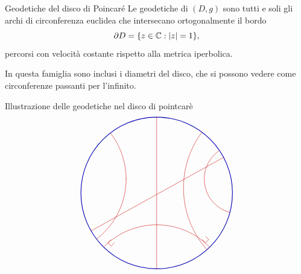 \documentclass[a4paper]{article}
\begin{document}
\begin{snippettheorem}{Geodetiche del disco di Poincaré}
Le geodetiche di \((D,g)\) sono tutti e soli gli archi di circonferenza euclidea che intersecano ortogonalmente il bordo
\[
    \partial D=\{z\in\mathbb{C}:|z|=1\},
\]
percorsi con velocità costante rispetto alla metrica iperbolica.

In questa famiglia sono inclusi i diametri del disco, che si possono vedere come circonferenze passanti per l'infinito.
\end{snippettheorem}

Illustrazione delle geodetiche nel disco di pointcarè
\[
\begin{tikzpicture}[scale=1.05, line cap=round, line join=round]
    \def\R{3}

    \colorlet{bordodisco}{blue!70!black}
    \colorlet{geod}{red!80!black}

    \pgfmathsetmacro{\rLeft}{sqrt((-4.20)^2 + (0.55)^2 - \R^2)}
    \pgfmathsetmacro{\rRightBig}{sqrt((4.75)^2 + (0.20)^2 - \R^2)}
    \pgfmathsetmacro{\rBottom}{sqrt((4.20)^2 - \R^2)}
    \pgfmathsetmacro{\rRightSmall}{sqrt((3.25)^2 + (0.55)^2 - \R^2)}

    \draw[bordodisco, thick] (0,0) circle[radius=\R];

    \draw[geod] (0,-\R) -- (0,\R);
    \draw[geod] ({\R*cos(210)},{\R*sin(210)}) -- ({\R*cos(28)},{\R*sin(28)});

    \begin{scope}
        \clip (0,0) circle[radius=\R];

        \draw[geod] (-4.20,0.55) circle[radius=\rLeft];

        \draw[geod] (4.75,0.20) circle[radius=\rRightBig];

        \draw[geod] (0,-4.20) circle[radius=\rBottom];

        \draw[geod] (3.25,0.55) circle[radius=\rRightSmall];
    \end{scope}

    \begin{scope}[shift={({0.86*\R*cos(-134.4)},{0.86*\R*sin(-134.4)})}, rotate=-134.4]
        \draw[geod] (0,0) -- (0.18,0) -- (0.18,0.18) -- (0,0.18);
    \end{scope}

    \begin{scope}[shift={({0.86*\R*cos(-45.6)},{0.86*\R*sin(-45.6)})}, rotate=-45.6]
        \draw[geod] (0,0) -- (0.18,0) -- (0.18,0.18) -- (0,0.18);
    \end{scope}
\end{tikzpicture}
\]
\end{document}
